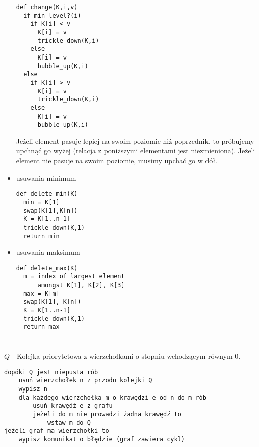 \documentclass[svgnames]{report}
\begin{document}
\begin{itemize}
\begin{verbatim}
def change(K,i,v)
  if min_level?(i)
    if K[i] < v
      K[i] = v
      trickle_down(K,i)
    else
      K[i] = v
      bubble_up(K,i)   
  else
    if K[i] > v
      K[i] = v
      trickle_down(K,i)
    else
      K[i] = v
      bubble_up(K,i)
\end{verbatim}

Jeżeli element pasuje lepiej na swoim poziomie niż poprzednik, to próbujemy upchnąć go wyżej (relacja z poniższymi elementami jest niezmieniona). Jeżeli element nie pasuje na swoim poziomie, musimy upchać go w dół.

\item{usuwania minimum}
\begin{verbatim}
def delete_min(K)
  min = K[1]
  swap(K[1],K[n])
  K = K[1..n-1]
  trickle_down(K,1)
  return min
 \end{verbatim}
\item{usuwania maksimum}
\begin{verbatim}
def delete_max(K)
  m = index of largest element 
      amongst K[1], K[2], K[3]
  max = K[m]
  swap(K[1], K[n])
  K = K[1..n-1]
  trickle_down(K,1)
  return max
\end{verbatim}
\end{itemize}
\section{}%

$Q$ - Kolejka priorytetowa z wierzchołkami o stopniu wchodzącym równym $0$.


\begin{verbatim}
dopóki Q jest niepusta rób
    usuń wierzchołek n z przodu kolejki Q
    wypisz n
    dla każdego wierzchołka m o krawędzi e od n do m rób
        usuń krawędź e z grafu
        jeżeli do m nie prowadzi żadna krawędź to
            wstaw m do Q
jeżeli graf ma wierzchołki to
    wypisz komunikat o błędzie (graf zawiera cykl)
\end{verbatim}    
\end{document}
